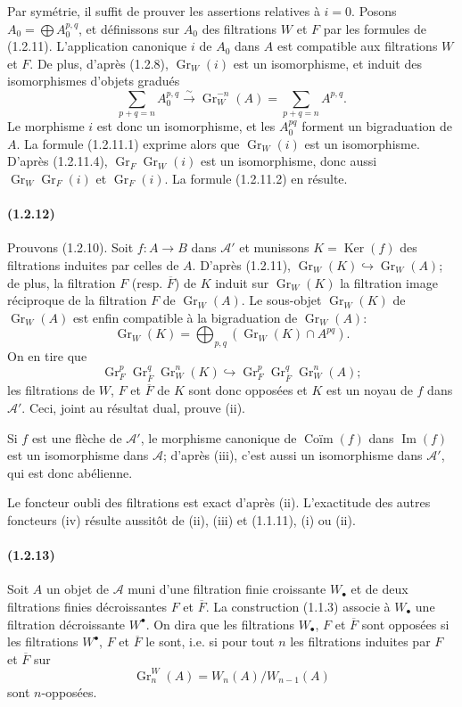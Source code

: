 \documentclass[10pt]{article}
\newcommand{\Gr}{\operatorname{Gr}}
\newcommand{\Ker}{\operatorname{Ker}}
\newcommand{\Imop}{\operatorname{Im}}
\newcommand{\fg}{\guillemotright}
\newcommand{\og}{\guillemotleft}
\newcommand{\calA}{\mathcal A}
\newcommand{\iso}{\xrightarrow{\sim}}
\begin{document}
Par symétrie, il suffit de prouver les assertions relatives à $i=0$. Posons $A_0=\bigoplus A_0^{p,q}$, et définissons sur $A_0$ des filtrations $W$ et $F$ par les formules de (1.2.11). L'application canonique $i$ de $A_0$ dans $A$ est compatible aux filtrations $W$ et $F$. De plus, d'après (1.2.8), $\Gr_W(i)$ est un isomorphisme, et induit des isomorphismes d'objets gradués
\[
\tag{1.2.11.4}
\sum_{p+q=n} A_0^{p,q}\iso \Gr_W^{-n}(A)=\sum_{p+q=n}A^{p,q}.
\]
Le morphisme $i$ est donc un isomorphisme, et les $A_0^{pq}$ forment un bigraduation de $A$. La formule (1.2.11.1) exprime alors que $\Gr_W(i)$ est un isomorphisme. D'après (1.2.11.4), $\Gr_F\Gr_W(i)$ est un isomorphisme, donc aussi $\Gr_W\Gr_F(i)$ et $\Gr_F(i)$. La formule (1.2.11.2) en résulte.

\paragraph{(1.2.12)} Prouvons (1.2.10). Soit $f:A\to B$ dans $\calA'$ et munissons $K=\Ker(f)$ des filtrations induites par celles de $A$. D'après (1.2.11), $\Gr_W(K)\hookrightarrow\Gr_W(A)$; de plus, la filtration $F$ (resp. $\overline F$) de $K$ induit sur $\Gr_W(K)$ la filtration image réciproque de la filtration $F$ de $\Gr_W(A)$. Le sous-objet $\Gr_W(K)$ de $\Gr_W(A)$ est enfin compatible à la bigraduation de $\Gr_W(A)$:
\[
\Gr_W(K)=\bigoplus_{p,q}(\Gr_W(K)\cap A^{pq}).
\]
On en tire que
\[
\Gr_F^p\Gr_{\overline F}^{q}\Gr_W^n(K)\hookrightarrow \Gr_F^p\Gr_{\overline F}^{q}\Gr_W^n(A);
\]
les filtrations de $W$, $F$ et $\overline F$ de $K$ sont donc opposées et $K$ est un noyau de $f$ dans $\calA'$. Ceci, joint au résultat dual, prouve (ii).

Si $f$ est une flèche de $\calA'$, le morphisme canonique de $\operatorname{Coïm}(f)$ dans $\Imop(f)$ est un isomorphisme dans $\calA$; d'après (iii), c'est aussi un isomorphisme dans $\calA'$, qui est donc abélienne.

Le foncteur \og oubli des filtrations\fg{} est exact d'après (ii). L'exactitude des autres foncteurs (iv) résulte aussitôt de (ii), (iii) et (1.1.11), (i) ou (ii).

\paragraph{(1.2.13)} Soit $A$ un objet de $\calA$ muni d'une filtration finie croissante $W_\bullet$ et de deux filtrations finies décroissantes $F$ et $\overline F$. La construction (1.1.3) associe à $W_\bullet$ une filtration décroissante $W^\bullet$. On dira que les filtrations $W_\bullet$, $F$ et $\overline F$ sont opposées si les filtrations $W^\bullet$, $F$ et $\overline F$ le sont, i.e. si pour tout $n$ les filtrations induites par $F$ et $\overline F$ sur
\[
\Gr_n^W(A)=W_n(A)/W_{n-1}(A)
\]
sont $n$-opposées.
\end{document}
